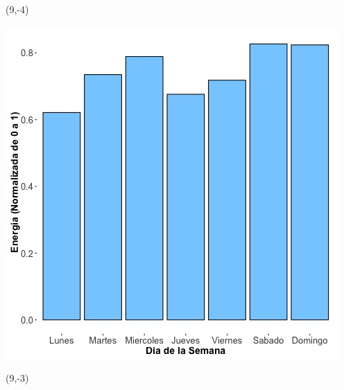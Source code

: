 \documentclass{article}\usepackage[]{graphicx}\usepackage[]{color}
\newenvironment{knitrout}{}{} %
\begin{document}
 \begin{textblock}{1}(9,-4)
\begin{minipage}{20em}
\begingroup

\endgroup
\end{minipage}
\end{textblock}


\begin{knitrout}
\color{fgcolor}
\includegraphics[scale=0.65]{figure/A7_day_of_week_plot} 
\end{knitrout}


 \begin{textblock}{1}(9,-3)
\begin{minipage}{20em}
\begingroup

\endgroup
\end{minipage}
\end{textblock}

 \vspace{2cm}
\end{document}
